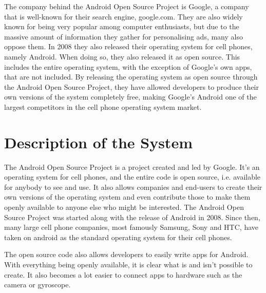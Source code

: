 \documentclass[conference]{IEEEtran}
\begin{document}

The company behind the Android Open Source Project is Google\cite{android}, a company that is well-known for their search engine, google.com. They are also widely known for being very popular among computer enthusiasts, but due to the massive amount of information they gather for personalising ads, many also oppose them. In 2008 they also released their operating system for cell phones, namely Android\cite{android-release}. When doing so, they also released it as open source\cite{android}. This includes the entire operating system, with the exception of Google's own apps, that are not included. By releasing the operating system as open source through the Android Open Source Project, they have allowed developers to produce their own versions of the system completely free, making Google's Android one of the largest competitors in the cell phone operating system market\cite{android-market}.


\section{Description of the System}
\label{system}

The Android Open Source Project is a project created and led by Google. It's an operating system for cell phones, and the entire code is open source, i.e. available for anybody to see and use. It also allows companies and end-users to create their own versions of the operating system and even contribute those to make them openly available to anyone else who might be interested\cite{android}. The Android Open Source Project was started along with the release of Android in 2008. Since then, many large cell phone companies, most famously Samsung, Sony and HTC, have taken on android as the standard operating system for their cell phones. 

The open source code also allows developers to easily write apps for Android. With everything being openly available, it is clear what is and isn't possible to create. It also becomes a lot easier to connect apps to hardware such as the camera or gyroscope.
\end{document}
